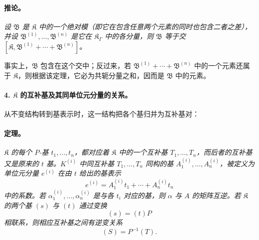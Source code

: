 \documentclass[11pt]{article}
\begin{document}
\paragraph{推论。}
\emph{设 $\mathfrak B$ 是 $\mathfrak K$ 中的一个绝对模（即它在包含任意两个元素的同时也包含二者之差），并设 $\mathfrak B^{(1)},\ldots,\mathfrak B^{(n)}$ 是它在 $\mathfrak K_\Gamma$ 中的各分量，则 $\mathfrak B$ 等于交 $[\mathfrak K,\mathfrak B^{(1)}+\cdots+\mathfrak B^{(n)}]$。}

事实上，$\mathfrak B$ 包含在这个交中；反过来，若 $\mathfrak B^{(1)}+\cdots+\mathfrak B^{(n)}$ 中的一个元素还属于 $\mathfrak K$，则根据该定理，它必为共轭分量之和，因而是 $\mathfrak B$ 中的元素。

\paragraph{4. $\mathfrak K$ 的互补基及其同单位元分量的关系。}
从不变结构转到基表示时，这一结构把各个基归并为互补基对：

\paragraph{定理。}
\emph{$\mathfrak K$ 的每个 $P$-基 $t_1,\ldots,t_n$，都对应着 $\mathfrak K$ 中的一个互补基 $T_1,\ldots,T_n$，而后者的互补基又是原来的 $t$ 基。$K^{(i)}$ 中同互补基 $T_1,\ldots,T_n$ 同构的基 $A_1^{(i)},\ldots,A_n^{(i)}$，被定义为单位元分量 $e^{(i)}$ 在由 $t$ 给出的基表示
\[
e^{(i)}=A_1^{(i)}t_1+\cdots+A_n^{(i)}t_n
\]
中的系数。若 $\alpha_1^{(i)},\ldots,\alpha_n^{(i)}$ 是与各 $t_i$ 对应的基，则 $\alpha$ 与 $A$ 的矩阵互逆。若 $\mathfrak K$ 的两个基 $(s)$ 与 $(t)$ 通过变换
\[
(s)=(t)P
\]
相联系，则相应互补基之间有逆变关系
\[
(S)=P^{-1}(T).
\]}
\end{document}
